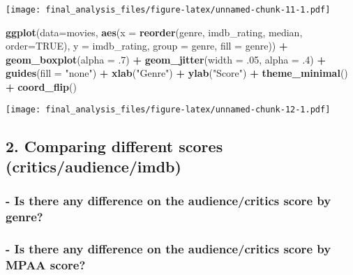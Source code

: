 \documentclass[]{article}
\newenvironment{Shaded}{\begin{snugshade}}{\end{snugshade}}
\newcommand{\KeywordTok}[1]{\textcolor[rgb]{0.13,0.29,0.53}{\textbf{#1}}}
\newcommand{\DataTypeTok}[1]{\textcolor[rgb]{0.13,0.29,0.53}{#1}}
\newcommand{\DecValTok}[1]{\textcolor[rgb]{0.00,0.00,0.81}{#1}}
\newcommand{\StringTok}[1]{\textcolor[rgb]{0.31,0.60,0.02}{#1}}
\newcommand{\OtherTok}[1]{\textcolor[rgb]{0.56,0.35,0.01}{#1}}
\newcommand{\OperatorTok}[1]{\textcolor[rgb]{0.81,0.36,0.00}{\textbf{#1}}}
\newcommand{\NormalTok}[1]{#1}
\begin{document}
\texttt{[image: final\_analysis\_files/figure-latex/unnamed-chunk-11-1.pdf]}

\begin{Shaded}
\begin{Highlighting}[]
\KeywordTok{ggplot}\NormalTok{(}\DataTypeTok{data=}\NormalTok{movies, }\KeywordTok{aes}\NormalTok{(}\DataTypeTok{x =} \KeywordTok{reorder}\NormalTok{(genre, imdb_rating, median, }\DataTypeTok{order=}\OtherTok{TRUE}\NormalTok{), }\DataTypeTok{y =}\NormalTok{ imdb_rating, }\DataTypeTok{group =}\NormalTok{ genre, }\DataTypeTok{fill =}\NormalTok{ genre)) }\OperatorTok{+}
\StringTok{  }\KeywordTok{geom_boxplot}\NormalTok{(}\DataTypeTok{alpha =}\NormalTok{ .}\DecValTok{7}\NormalTok{) }\OperatorTok{+}
\StringTok{  }\KeywordTok{geom_jitter}\NormalTok{(}\DataTypeTok{width =}\NormalTok{ .}\DecValTok{05}\NormalTok{, }\DataTypeTok{alpha =}\NormalTok{ .}\DecValTok{4}\NormalTok{) }\OperatorTok{+}
\StringTok{  }\KeywordTok{guides}\NormalTok{(}\DataTypeTok{fill =} \StringTok{"none"}\NormalTok{) }\OperatorTok{+}
\StringTok{  }\KeywordTok{xlab}\NormalTok{(}\StringTok{"Genre"}\NormalTok{) }\OperatorTok{+}
\StringTok{  }\KeywordTok{ylab}\NormalTok{(}\StringTok{"Score"}\NormalTok{) }\OperatorTok{+}
\StringTok{  }\KeywordTok{theme_minimal}\NormalTok{() }\OperatorTok{+}
\StringTok{  }\KeywordTok{coord_flip}\NormalTok{()}
\end{Highlighting}
\end{Shaded}

\texttt{[image: final\_analysis\_files/figure-latex/unnamed-chunk-12-1.pdf]}

\subsection{2. Comparing different scores
(critics/audience/imdb)}\label{comparing-different-scores-criticsaudienceimdb-1}

\subsubsection{- Is there any difference on the audience/critics score
by
genre?}\label{is-there-any-difference-on-the-audiencecritics-score-by-genre}

\subsubsection{- Is there any difference on the audience/critics score
by MPAA
score?}\label{is-there-any-difference-on-the-audiencecritics-score-by-mpaa-score}
\end{document}
